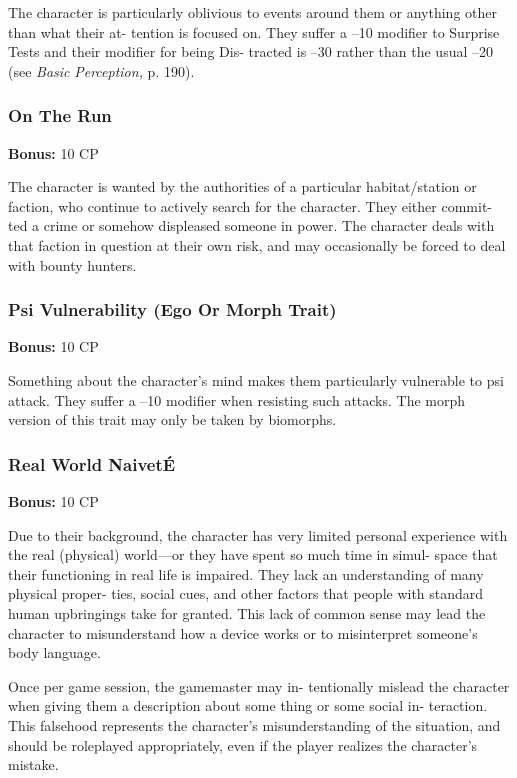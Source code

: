 The character is particularly oblivious to events 
around them or anything other than what their at-
tention is focused on. They suffer a –10 modifier 
to Surprise Tests and their modifier for being Dis-
tracted is –30 rather than the usual –20 (see \textit{Basic }
\textit{Perception,} p. 190).

\subsubsection{On The Run}

\textbf{Bonus:} 10 CP

The character is wanted by the authorities of a 
particular habitat/station or faction, who continue to 
actively search for the character. They either commit-
ted a crime or somehow displeased someone in power. 
The character deals with that faction in question at 
their own risk, and may occasionally be forced to deal 
with bounty hunters.

\subsubsection{Psi Vulnerability (Ego Or Morph Trait)}

\textbf{Bonus:} 10 CP

Something about the character's mind makes 
them particularly vulnerable to psi attack. They 
suffer a –10 modifier when resisting such attacks. 
The morph version of this trait may only be taken 
by biomorphs.

\subsubsection{Real World NaivetÉ}

\textbf{Bonus:} 10 CP

Due to their background, the character has very 
limited personal experience with the real (physical) 
world—or they have spent so much time in simul-
space that their functioning in real life is impaired. 
They lack an understanding of many physical proper-
ties, social cues, and other factors that people with 
standard human upbringings take for granted. This 
lack of common sense may lead the character to 
misunderstand how a device works or to misinterpret 
someone's body language.

Once per game session, the gamemaster may in-
tentionally mislead the character when giving them 
a description about some thing or some social in-
teraction. This falsehood represents the character's 
misunderstanding of the situation, and should be 
roleplayed appropriately, even if the player realizes 
the character's mistake.

